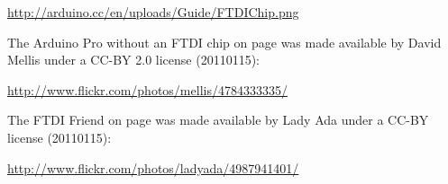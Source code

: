 \small{\url{http://arduino.cc/en/uploads/Guide/FTDIChip.png}}

The Arduino Pro without an FTDI chip on page \pageref{image:no-ftdi-arduino} was made available by David Mellis under a CC-BY 2.0 license (20110115):

\small{\url{http://www.flickr.com/photos/mellis/4784333335/}}

The FTDI Friend on page \pageref{image:ftdi-friend} was made available by Lady Ada under a  CC-BY license  (20110115):

\small{\url{http://www.flickr.com/photos/ladyada/4987941401/}}

